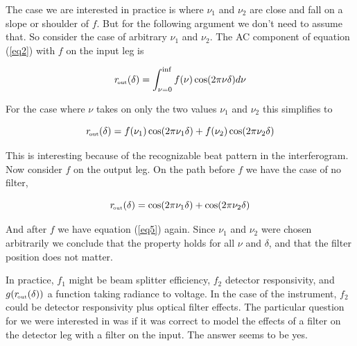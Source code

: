 \documentclass[12pt]{article}
\begin{document}
The case we are interested in practice is where $\nu_1$ and $\nu_2$
are close and fall on a slope or shoulder of $f$.  But for the
following argument we don't need to assume that.  So consider the
case of arbitrary $\nu_1$ and $\nu_2$.  The AC component of equation
(\ref{eq2}) with $f$ on the input leg is

\begin{equation}\label{eq4}
  r_{\!\mbox{\tiny out}}(\delta) = \int_{\nu=0}^{\inf}f(\nu)\cos(2\pi\nu\delta)d\nu
\end{equation}

\noindent
For the case where $\nu$ takes on only the two values $\nu_1$ and
$\nu_2$ this simplifies to

\begin{equation}\label{eq5}
  r_{\!\mbox{\tiny out}}(\delta) = f(\nu_1)\cos(2\pi\nu_1\delta) + 
                  f(\nu_2)\cos(2\pi\nu_2\delta)
\end{equation}

\noindent
This is interesting because of the recognizable beat pattern in 
the interferogram.  Now consider $f$ on the output leg.  On the 
path before $f$ we have the case of no filter,

\begin{equation}\label{eq6}
  r_{\!\mbox{\tiny out}}(\delta) = \cos(2\pi\nu_1\delta) + 
                  \cos(2\pi\nu_2\delta)
\end{equation}

\noindent
And after $f$ we have equation (\ref{eq5}) again.  Since $\nu_1$ and
$\nu_2$ were chosen arbitrarily we conclude that the property holds
for all $\nu$ and $\delta$, and that the filter position does not
matter.

In practice, $f_1$ might be beam splitter efficiency, $f_2$ detector
responsivity, and $g(r_{\!\mbox{\tiny out}}(\delta))$ a function taking radiance to
voltage.  In the case of the {\cris} instrument, $f_2$ could be
detector responsivity plus optical filter effects.  The particular
question for {\cris} we were interested in was if it was correct
to model the effects of a filter on the detector leg with a filter
on the input.  The answer seems to be yes.
\end{document}
